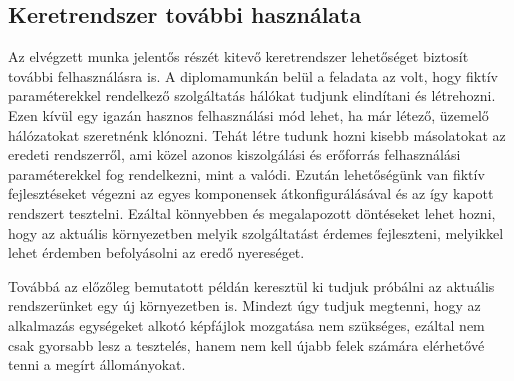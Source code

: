 \subsection{Keretrendszer további használata}
Az elvégzett munka jelentős részét kitevő keretrendszer lehetőséget biztosít további felhasználásra is.
A diplomamunkán belül a feladata az volt, hogy fiktív paraméterekkel rendelkező szolgáltatás hálókat tudjunk elindítani és létrehozni.
Ezen kívül egy igazán hasznos felhasználási mód lehet, ha már létező, üzemelő hálózatokat szeretnénk klónozni.
Tehát létre tudunk hozni kisebb másolatokat az eredeti rendszerről, ami közel azonos kiszolgálási és erőforrás felhasználási paraméterekkel fog rendelkezni, mint a valódi.
Ezután lehetőségünk van fiktív fejlesztéseket végezni az egyes komponensek átkonfigurálásával és az így kapott rendszert tesztelni.
Ezáltal könnyebben és megalapozott döntéseket lehet hozni, hogy az aktuális környezetben melyik szolgáltatást érdemes fejleszteni, melyikkel lehet érdemben befolyásolni az eredő nyereséget.

Továbbá az előzőleg bemutatott példán keresztül ki tudjuk próbálni az aktuális rendszerünket egy új környezetben is.
Mindezt úgy tudjuk megtenni, hogy az alkalmazás egységeket alkotó képfájlok mozgatása nem szükséges, ezáltal nem csak gyorsabb lesz a tesztelés, hanem nem kell újabb felek számára elérhetővé tenni a megírt állományokat.